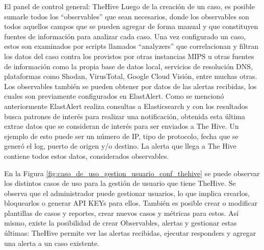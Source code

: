 \begin{section}{El panel de control general: TheHive }
     Luego de la creación de un caso, es posible sumarle todos los “observables” que sean necesarios, donde los observables son todos aquellos campos que se pueden agregar de forma manual y que constituyen fuentes de información para analizar cada caso. Una vez configurado un caso, estos son examinados por scripts llamados “analyzers” que correlacionan y filtran los datos del caso contra los provistos por otras instancias MIPS u otras fuentes de información como la propia base de datos local, servicios de resolución DNS, plataformas como Shodan\cite{shodan}, VirusTotal\cite{virustotal}, Google Cloud Visión\cite{vision-AI}, entre muchas otras. Los observables también se pueden obtener por datos de las alertas recibidas, los cuales son previamente configurados en ElastAlert. Como se mencionó anteriormente ElastAlert realiza consultas a Elasticsearch y con los resultados busca patrones de interés para realizar una notificación, obtenida esta última extrae datos que se consideran de interés para ser enviados a The Hive. Un ejemplo de esto puede ser un número de IP, tipo de protocolo, fecha que se generó el log, puerto de origen y/o destino. La alerta que llega a The Hive contiene todos estos datos, considerados observables. \par
     En la Figura \ref{fig:caso_de_uso_gestion_usuario_conf_thehive} se puede observar los distintos casos de uso para la gestión de usuario que tiene TheHive. Se observa que el administrador puede gestionar usuarios, lo que implica crearlos, bloquearlos o generar API KEYs para ellos. También es posible crear o modificar plantillas de casos y reportes, crear nuevos casos y métricas para estos. Así mismo, existe la posibilidad de  crear Observables, alertas y gestionar estas últimas: TheHive permite ver las alertas recibidas, ejecutar responders y agregar una alerta a un caso existente.\par


\end{section}
